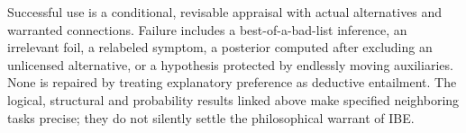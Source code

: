 Successful use is a conditional, revisable appraisal with actual alternatives
and warranted connections. Failure includes a best-of-a-bad-list inference,
an irrelevant foil, a relabeled symptom, a posterior computed after excluding
an unlicensed alternative, or a hypothesis protected by endlessly moving
auxiliaries. None is repaired by treating explanatory preference as
deductive entailment. The logical, structural and probability results
linked above make specified neighboring tasks precise; they do not
silently settle the philosophical warrant of IBE.

